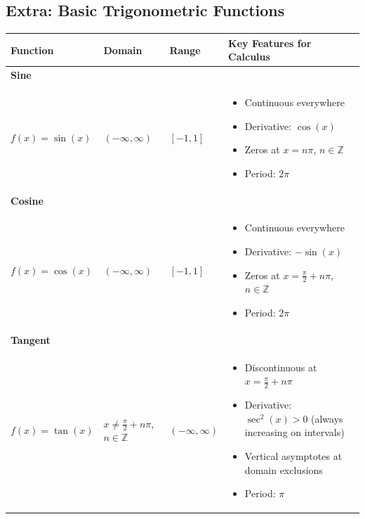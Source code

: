 \documentclass[../main-notes.tex]{subfile}
\begin{document}
\justifying

\subsection*{Extra: Basic Trigonometric Functions}

\begin{table}[h]
\centering
\renewcommand{\arraystretch}{1.8}
\begin{tabular}{@{}>{\raggedright\arraybackslash}p{3cm}llp{6cm}@{}}
\toprule
\textbf{Function} & \textbf{Domain} & \textbf{Range} & \textbf{Key Features for Calculus} \\ 
\midrule
\textbf{Sine} & & & \\
\( f(x) = \sin(x) \) & \( (-\infty, \infty) \) & \( [-1, 1] \) & 
\begin{minipage}{6cm}
\begin{itemize}
    \item Continuous everywhere
    \item Derivative: \( \cos(x) \)
    \item Zeros at \( x = n\pi \), \( n \in \mathbb{Z} \)
    \item Period: \( 2\pi \)
\end{itemize}
\end{minipage} \\
\addlinespace
\textbf{Cosine} & & & \\
\( f(x) = \cos(x) \) & \( (-\infty, \infty) \) & \( [-1, 1] \) &
\begin{minipage}{6cm}
\begin{itemize}
    \item Continuous everywhere
    \item Derivative: \( -\sin(x) \)
    \item Zeros at \( x = \frac{\pi}{2} + n\pi \), \( n \in \mathbb{Z} \)
    \item Period: \( 2\pi \)
\end{itemize}
\end{minipage} \\
\addlinespace
\textbf{Tangent} & & & \\
\( f(x) = \tan(x) \) & \( x \neq \frac{\pi}{2} + n\pi \), \( n \in \mathbb{Z} \) & \( (-\infty, \infty) \) &
\begin{minipage}{6cm}
\begin{itemize}
    \item Discontinuous at \( x = \frac{\pi}{2} + n\pi \)
    \item Derivative: \( \sec^2(x) > 0 \) (always increasing on intervals)
    \item Vertical asymptotes at domain exclusions
    \item Period: \( \pi \)
\end{itemize}
\end{minipage} \\
\bottomrule
\end{tabular}
\end{table}
\end{document}
